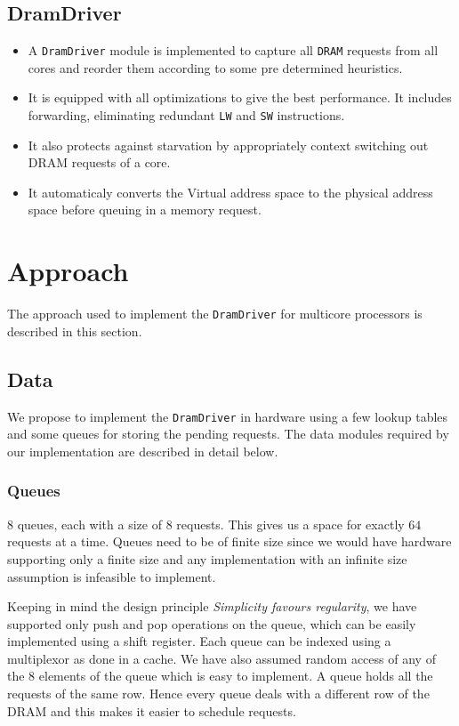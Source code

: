 \documentclass[hidelinks,12pt]{article}
\begin{document}
\subsection{DramDriver}
\begin{itemize}
    \item A \verb|DramDriver| module is implemented to capture all \verb|DRAM| requests from all cores and reorder them according to some pre determined heuristics.
    \item It is equipped with all optimizations to give the best performance. It includes forwarding, eliminating redundant \verb|LW| and \verb|SW| instructions.
    \item It also protects against starvation by appropriately context switching out DRAM requests of a core.
    \item It automaticaly converts the Virtual address space to the physical address space before queuing in a memory request.
\end{itemize}

\section{Approach}

The approach used to implement the \verb|DramDriver| for multicore processors is described in this section.
\subsection{Data}
We propose to implement the \verb|DramDriver| in hardware using a few lookup tables and some queues for storing the pending requests.
The data modules required by our implementation are described in detail below.
\subsubsection{Queues}
$8$ queues, each with a size of $8$ requests. This gives us a space for exactly $64$ requests at a time.
Queues need to be of finite size since we would have hardware supporting only a finite size and any implementation with an infinite size assumption is infeasible to implement.

Keeping in mind the design principle \textit{Simplicity favours regularity}, we have supported only push and pop operations on the queue,
which can be easily implemented using a shift register. Each queue can be indexed using a multiplexor as done in a cache.
We have also assumed random access of any of the 8 elements of the queue which is easy to implement.
A queue holds all the requests of the same row. Hence every queue deals with a different row of the DRAM and this makes it easier to schedule requests.\\
\end{document}
